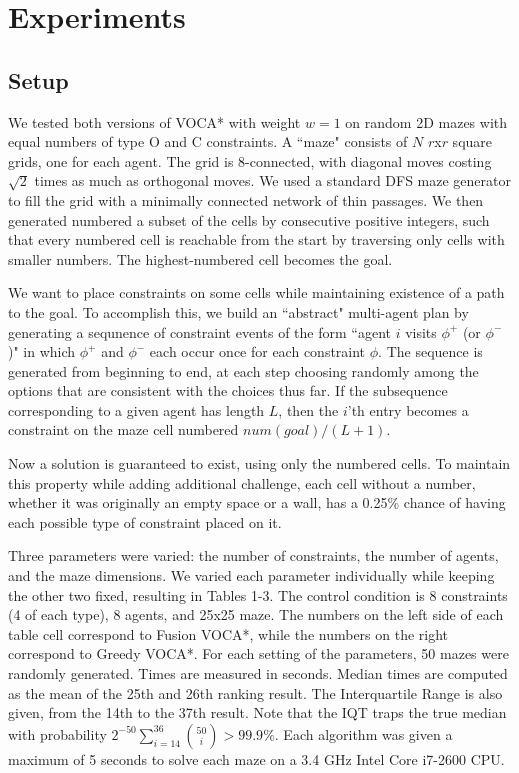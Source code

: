\documentclass[letterpaper]{article}
\begin{document}
\section{Experiments}

\subsection{Setup}
We tested both versions of VOCA* with weight $w = 1$ on random 2D mazes with equal numbers of type O and C constraints. A ``maze" consists of $N$ $r$x$r$ square grids, one for each agent. The grid is 8-connected, with diagonal moves costing $\sqrt{2}$ times as much as orthogonal moves. We used a standard DFS maze generator to fill the grid with a minimally connected network of thin passages. We then generated numbered a subset of the cells by consecutive positive integers, such that every numbered cell is reachable from the start by traversing only cells with smaller numbers. The highest-numbered cell becomes the goal.

We want to place constraints on some cells while maintaining existence of a path to the goal. To accomplish this, we build an ``abstract" multi-agent plan by generating a sequnence of constraint events of the form ``agent $i$ visits $\phi^+$ (or $\phi^-$)" in which $\phi^+$ and $\phi^-$ each occur once for each constraint $\phi$. The sequence is generated from beginning to end, at each step choosing randomly among the options that are consistent with the choices thus far. If the subsequence corresponding to a given agent has length $L$, then the $i$'th entry becomes a constraint on the maze cell numbered $num(goal) /  (L+1)$.

Now a solution is guaranteed to exist, using only the numbered cells. To maintain this property while adding additional challenge, each cell without a number, whether it was originally an empty space or a wall, has a 0.25\% chance of having each possible type of constraint placed on it.

Three parameters were varied: the number of constraints, the number of agents, and the maze dimensions. We varied each parameter individually while keeping the other two fixed, resulting in Tables 1-3. The control condition is 8 constraints (4 of each type), 8 agents, and 25x25 maze. The numbers on the left side of each table cell correspond to Fusion VOCA*, while the numbers on the right correspond to Greedy VOCA*. For each setting of the parameters, 50 mazes were randomly generated. Times are measured in seconds. Median times are computed as the mean of the 25th and 26th ranking result. The Interquartile Range is also given, from the 14th to the 37th result. Note that the IQT traps the true median with probability  $2^{-50} \sum_{i=14}^{36} \binom{50}{i} > 99.9\%$. Each algorithm was given a maximum of 5 seconds to solve each maze on a 3.4 GHz Intel Core i7-2600 CPU.
\end{document}
